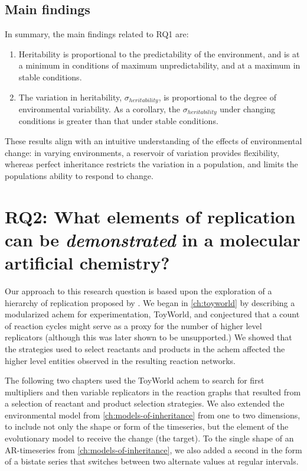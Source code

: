 \subsection{Main findings}

In summary, the main findings related to RQ1 are:

\begin{enumerate}
\item Heritability is proportional to the predictability of the environment, and is at a minimum in conditions of maximum unpredictability, and at a maximum in stable conditions.
\item The variation in heritability, $\sigma_{heritability}$, is proportional to the degree of environmental variability. As a corollary, the $\sigma_{heritability}$ under changing conditions is greater than that under stable conditions.
\end{enumerate}

These results align with an intuitive understanding of the effects of environmental change: in varying environments, a reservoir of variation provides flexibility, whereas perfect inheritance restricts the variation in a population, and limits the populations ability to respond to change. 

\section{RQ2: What elements of replication can be \emph{demonstrated} in a molecular artificial chemistry?}

Our approach to this research question is based upon the exploration of a hierarchy of replication proposed by \textcite{Zachar2010}. We began in \cref{ch:toyworld} by describing a modularized \gls{achem} for experimentation, ToyWorld, and conjectured that a count of reaction cycles might serve as a proxy for the number of higher level replicators (although this was later shown to be unsupported.) We showed that the strategies used to select reactants and products in the \gls{achem} affected the higher level entities observed in the resulting reaction networks. 

The following two chapters used the ToyWorld \gls{achem} to search for first multipliers and then variable replicators in the reaction graphs that resulted from a selection of reactant and product selection strategies. We also extended the environmental model from \cref{ch:models-of-inheritance} from one to two dimensions, to include not only the shape or form of the timeseries, but the element of the evolutionary model to receive the change (the target). To the single shape of an AR-timeseries from \cref{ch:models-of-inheritance}, we also added a second in the form of a bistate series that switches between two alternate values at regular intervals. 


